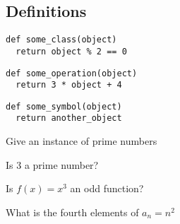 \subsection{Definitions}

\begin{verbatim}
def some_class(object)
  return object % 2 == 0
\end{verbatim}

\begin{verbatim}
def some_operation(object)
  return 3 * object + 4
\end{verbatim}

\begin{verbatim}
def some_symbol(object)
  return another_object
\end{verbatim}

\begin{example}
  Give an instance of prime numbers
\end{example}

\begin{example}
  Is 3 a prime number?
\end{example}

\begin{example}
  Is $f(x) = x^3$ an odd function?
\end{example}

\begin{example}
  What is the fourth elements of $a_n = n^2$
\end{example}
